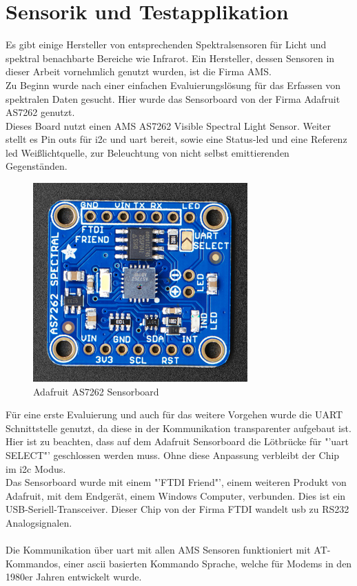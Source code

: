 \documentclass[11pt]{scrartcl}
\begin{document}
\section{Sensorik und Testapplikation}
Es gibt einige Hersteller von entsprechenden Spektralsensoren für Licht und spektral benachbarte Bereiche wie Infrarot.
Ein Hersteller, dessen Sensoren in dieser Arbeit vornehmlich genutzt wurden, ist die Firma AMS.\\
Zu Beginn wurde nach einer einfachen Evaluierungslösung für das Erfassen von spektralen Daten gesucht. Hier wurde das
Sensorboard von der Firma Adafruit AS7262 genutzt.\cite{adafruit}\\
Dieses Board nutzt einen AMS AS7262 Visible Spectral Light Sensor. Weiter stellt es Pin outs für \ac{i2c} und \ac{uart} bereit,
sowie eine Status-\ac{led} und eine Referenz \ac{led} Weißlichtquelle, zur Beleuchtung von nicht selbst emittierenden
Gegenständen.
\begin{figure}[H]
    \begin{center}
        \includegraphics[width=.48\textwidth]{images/AS7262_front.png}
    \end{center}
    \caption{Adafruit AS7262 Sensorboard\cite{adafruit}}
\end{figure}
\noindent
Für eine erste Evaluierung und auch für das weitere Vorgehen wurde die UART Schnittstelle genutzt, da diese in der Kommunikation
transparenter aufgebaut ist.\\
Hier ist zu beachten, dass auf dem Adafruit Sensorboard die Lötbrücke für "'\ac{uart} SELECT"' geschlossen werden muss. Ohne diese
Anpassung verbleibt der Chip im \ac{i2c} Modus.\\
Das Sensorboard wurde mit einem "'FTDI Friend"', einem weiteren Produkt von Adafruit, mit dem Endgerät, einem Windows Computer, verbunden.
Dies ist ein USB-Seriell-Transceiver. Dieser Chip von der Firma FTDI wandelt \ac{usb} zu RS232 Analogsignalen.\\
\\
Die Kommunikation über \ac{uart} mit allen AMS Sensoren funktioniert mit AT-Kommandos, einer \ac{ascii} basierten Kommando Sprache,
welche für Modems in den 1980er Jahren entwickelt wurde.
\end{document}
